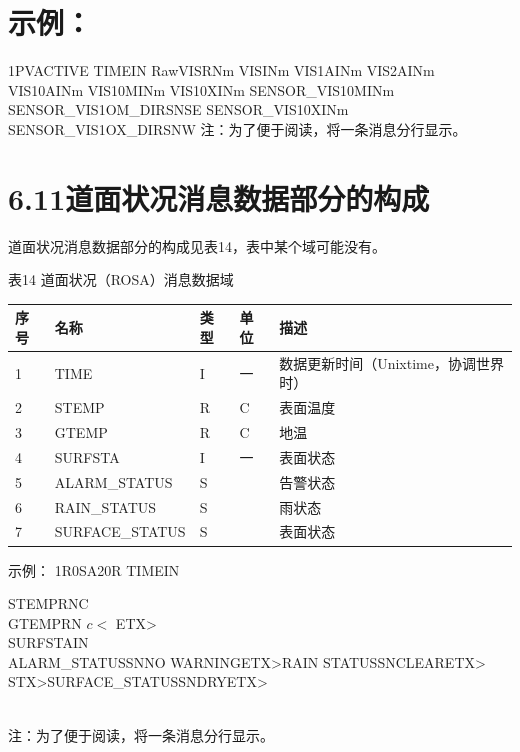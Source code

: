 \documentclass[
  10
]{article}
\begin{document}
\section{示例：}\label{ux793aux4f8b-7}

1\textbar\textbar PV\textbar ACTIVE
TIME\textbar I\textbar N\textbar{}
RawVIS\textbar R\textbar N\textbar m
VIS\textbar I\textbar N\textbar m
VIS1A\textbar I\textbar N\textbar m
VIS2A\textbar I\textbar N\textbar m
VIS10A\textbar I\textbar N\textbar m
VIS10M\textbar I\textbar N\textbar m
VIS10X\textbar I\textbar N\textbar m
SENSOR\_VIS10M\textbar I\textbar N\textbar m
SENSOR\_VIS1OM\_DIR\textbar S\textbar N\textbar SE\textbar{}
SENSOR\_VIS10X\textbar I\textbar N\textbar m
SENSOR\_VIS1OX\_DIR\textbar S\textbar N\textbar W\textbar{}
注：为了便于阅读，将一条消息分行显示。

\section{6.11道面状况消息数据部分的构成}\label{ux9053ux9762ux72b6ux51b5ux6d88ux606fux6570ux636eux90e8ux5206ux7684ux6784ux6210}

道面状况消息数据部分的构成见表14，表中某个域可能没有。

表14 道面状况（ROSA）消息数据域

\begin{longtable}[]{@{}|l|l|l|l|l|@{}}
\toprule\noalign{}
\endhead
\bottomrule\noalign{}
\endlastfoot
\hline
序号 & 名称 & 类型 & 单位 & 描述 \\
\hline
1 & TIME & I & 一 & 数据更新时间（Unixtime，协调世界时） \\
\hline
2 & STEMP & R & C & 表面温度 \\
\hline
3 & GTEMP & R & C & 地温 \\
\hline
4 & SURFSTA & I & 一 & 表面状态 \\
\hline
5 & ALARM\_STATUS & S & & 告警状态 \\
\hline
6 & RAIN\_STATUS & S & & 雨状态 \\
\hline
7 & SURFACE\_STATUS & S & & 表面状态 \\
\hline
\end{longtable}

示例： 1\textbar R0SA\textbar20R
TIME\textbar I\textbar N\textbar{}

STEMP\textbar R\textbar N\textbar C\\
GTEMP\textbar R\textbar N\textbar{} \(c <\)
ETX\textgreater{}\\
SURFSTAIN\textbar{}\\
ALARM\_STATUS\textbar S\textbar N\textbar NO WARNINGETX\textgreater RAIN
STATUSSNCLEARETX\textgreater{}\\
STX\textgreater SURFACE\_STATUS\textbar S\textbar NDRYETX\textgreater{}\\
\strut \\
注：为了便于阅读，将一条消息分行显示。
\end{document}

